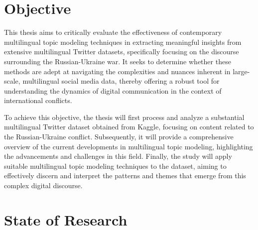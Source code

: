 \documentclass[
    11pt,
    a4paper,
    egregdoesnotlikesansseriftitles,
    toc=chapterentrywithdots,
    oneside,openright,
    titlepage,
    parskip=half,
    headings=normal,  %
    listof=totoc,
    bibliography=totoc,
    index=totoc,
    captions=tableheading,  %
    chapterprefix,
    listof=flat,
    final
]{scrbook}
\begin{document}
{\let\clearpage\relax \chapter{Objective}}
This thesis aims to critically evaluate the effectiveness of contemporary multilingual topic modeling techniques in extracting meaningful insights from extensive multilingual Twitter datasets, specifically focusing on the discourse surrounding the Russian-Ukraine war. It seeks to determine whether these methods are adept at navigating the complexities and nuances inherent in large-scale, multilingual social media data, thereby offering a robust tool for understanding the dynamics of digital communication in the context of international conflicts.

To achieve this objective, the thesis will first process and analyze a substantial multilingual Twitter dataset obtained from Kaggle, focusing on content related to the Russian-Ukraine conflict. Subsequently, it will provide a comprehensive overview of the current developments in multilingual topic modeling, highlighting the advancements and challenges in this field. Finally, the study will apply suitable multilingual topic modeling techniques to the dataset, aiming to effectively discern and interpret the patterns and themes that emerge from this complex digital discourse.

{\let\clearpage\relax \chapter{State of Research}}
\end{document}
